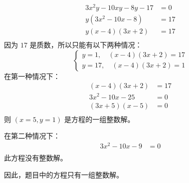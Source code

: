 \documentclass[answers]{exam}
\begin{document}
\begin{questions}
	\begin{solution}
		\begin{align*}
			3x^2y - 10xy - 8y - 17 & = 0  \\
			y(3x^2 - 10x - 8)      & = 17 \\
			y(x-4)(3x+2)           & = 17 \\
		\end{align*}
		因为 \( 17 \) 是质数，所以只能有以下两种情况：
		\begin{equation*}
			\begin{cases}
				y = 1, \quad (x-4)(3x+2) = 17 \\
				y = 17,\quad  (x-4)(3x+2) = 1
			\end{cases}
		\end{equation*}
		在第一种情况下：
		\begin{align*}
			(x-4)(3x+2)     & = 17 \\
			3x^2 -10x - 25  & = 0  \\
			(3x + 5)(x - 5) & = 0  \\
		\end{align*}
		则 \( (x=5, y=1) \) 是方程的一组整数解。

		在第二种情况下：
		\begin{align*}
			3x^2 - 10x - 9 & = 0 \\
		\end{align*}
		此方程没有整数解。

		因此，题目中的方程只有一组整数解。
	\end{solution}


\end{questions}
\end{document}

